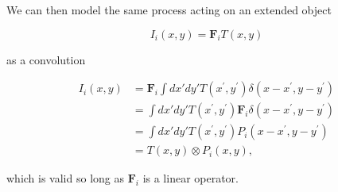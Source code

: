 \documentclass{aastex63}
\begin{document}
We can then model the same process acting on an extended object
\begin{linenomath}\begin{equation}
    I_i(x,y) = \mathbf{F}_i T(x,y)
\end{equation}\end{linenomath}
as a convolution
\begin{linenomath}\begin{align}
    I_i(x,y) &= \mathbf{F}_i \int dx' dy' T(x^\prime,y^\prime) \delta(x-x^\prime,y-y^\prime) \nonumber\\
    &= \int dx' dy' T(x^\prime,y^\prime) \mathbf{F}_i \delta(x-x^\prime,y-y^\prime) \nonumber\\
    &= \int dx' dy'  T(x^\prime,y^\prime) P_i(x-x^\prime,y-y^\prime) \nonumber\\
    &= T(x,y) \otimes P_i(x,y),
\end{align}\end{linenomath}
which is valid so long as $\mathbf{F}_i$ is a linear operator.
\end{document}
